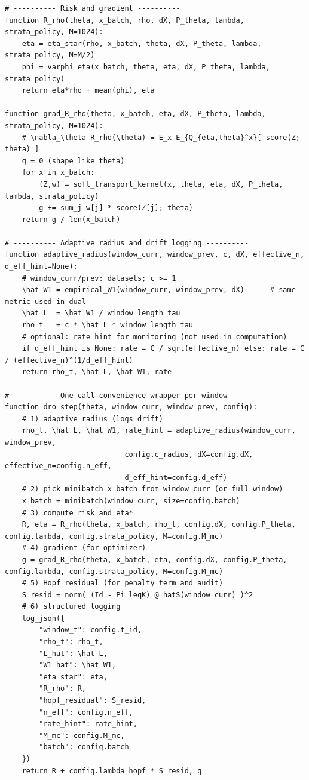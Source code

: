 \documentclass[10pt]{article}
\begin{document}
\begin{lstlisting}
# ---------- Risk and gradient ----------
function R_rho(theta, x_batch, rho, dX, P_theta, lambda, strata_policy, M=1024):
    eta = eta_star(rho, x_batch, theta, dX, P_theta, lambda, strata_policy, M=M/2)
    phi = varphi_eta(x_batch, theta, eta, dX, P_theta, lambda, strata_policy)
    return eta*rho + mean(phi), eta

function grad_R_rho(theta, x_batch, eta, dX, P_theta, lambda, strata_policy, M=1024):
    # \nabla_\theta R_rho(\theta) = E_x E_{Q_{eta,theta}^x}[ score(Z; theta) ]
    g = 0 (shape like theta)
    for x in x_batch:
        (Z,w) = soft_transport_kernel(x, theta, eta, dX, P_theta, lambda, strata_policy)
        g += sum_j w[j] * score(Z[j]; theta)
    return g / len(x_batch)

# ---------- Adaptive radius and drift logging ----------
function adaptive_radius(window_curr, window_prev, c, dX, effective_n, d_eff_hint=None):
    # window_curr/prev: datasets; c >= 1
    \hat W1 = empirical_W1(window_curr, window_prev, dX)      # same metric used in dual
    \hat L  = \hat W1 / window_length_tau
    rho_t   = c * \hat L * window_length_tau
    # optional: rate hint for monitoring (not used in computation)
    if d_eff_hint is None: rate = C / sqrt(effective_n) else: rate = C / (effective_n)^(1/d_eff_hint)
    return rho_t, \hat L, \hat W1, rate

# ---------- One-call convenience wrapper per window ----------
function dro_step(theta, window_curr, window_prev, config):
    # 1) adaptive radius (logs drift)
    rho_t, \hat L, \hat W1, rate_hint = adaptive_radius(window_curr, window_prev,
                            config.c_radius, dX=config.dX, effective_n=config.n_eff,
                            d_eff_hint=config.d_eff)
    # 2) pick minibatch x_batch from window_curr (or full window)
    x_batch = minibatch(window_curr, size=config.batch)
    # 3) compute risk and eta*
    R, eta = R_rho(theta, x_batch, rho_t, config.dX, config.P_theta, config.lambda, config.strata_policy, M=config.M_mc)
    # 4) gradient (for optimizer)
    g = grad_R_rho(theta, x_batch, eta, config.dX, config.P_theta, config.lambda, config.strata_policy, M=config.M_mc)
    # 5) Hopf residual (for penalty term and audit)
    S_resid = norm( (Id - Pi_leqK) @ hatS(window_curr) )^2
    # 6) structured logging
    log_json({
        "window_t": config.t_id,
        "rho_t": rho_t,
        "L_hat": \hat L,
        "W1_hat": \hat W1,
        "eta_star": eta,
        "R_rho": R,
        "hopf_residual": S_resid,
        "n_eff": config.n_eff,
        "rate_hint": rate_hint,
        "M_mc": config.M_mc,
        "batch": config.batch
    })
    return R + config.lambda_hopf * S_resid, g
\end{lstlisting}
\end{document}
